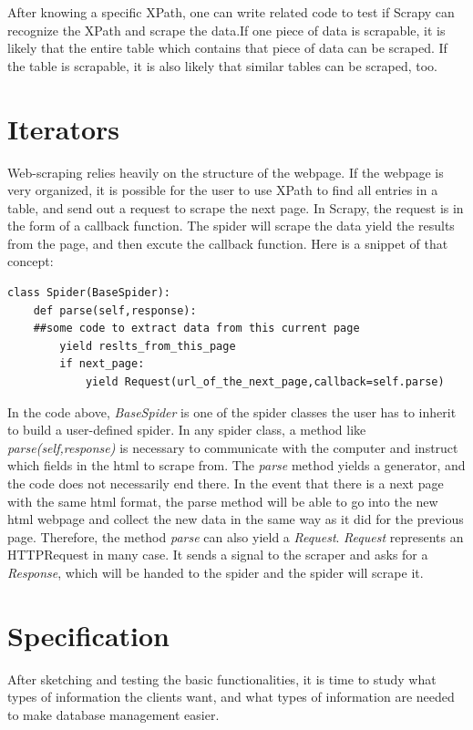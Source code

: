 \documentclass[12pt]{report}
\begin{document}
After knowing a specific XPath, one can write related code to test if Scrapy can recognize the XPath and scrape the data.If one piece of data is scrapable, it is likely that the entire table which contains that piece of data can be scraped. If the table is scrapable, it is also likely that similar tables can be scraped, too.

\section{Iterators}

Web-scraping relies heavily on the structure of the webpage. If the webpage is very organized, it is possible for the user to use XPath to find all entries in a table, and send out a request to scrape the next page. In Scrapy, the request is in the form of a callback function. The spider will scrape the data yield the results from the page, and then excute the callback function. Here is a snippet of that concept:
\begin{lstlisting}
class Spider(BaseSpider):
	def parse(self,response):
	##some code to extract data from this current page
		yield reslts_from_this_page
		if next_page:
			yield Request(url_of_the_next_page,callback=self.parse)
\end{lstlisting}

In the code above, \textit{BaseSpider} is one of the spider classes the user has to inherit to build a user-defined spider. In any spider class, a method like \textit{parse(self,response)} is necessary to communicate with the computer and instruct which fields in the html to scrape from. The \textit{parse} method yields a generator, and the code does not necessarily end there. In the event that there is a next page with the same html format, the parse method will be able to go into the new html webpage and collect the new data in the same way as it did for the previous page. Therefore, the method \textit{parse} can also yield a \textit{Request}. \textit{Request} represents an HTTPRequest in many case. It sends a signal to the scraper and asks for a \textit{Response}, which will be handed to the spider and the spider will scrape it.

\section{Specification}

After sketching and testing the basic functionalities, it is time to study what types of information the clients want, and what types of information are needed to make database management easier. 
\end{document}
